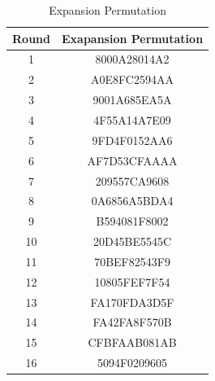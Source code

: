 \documentclass[12pt, letterpaper]{article}
\begin{document}
\begin{table}[h]
    \centering
    \begin{tabular}{|c|c|}
        
        \hline
        Round & Exapansion Permutation \\
        \hline
        1 & 8000A28014A2   \\
        \hline
        2 & A0E8FC2594AA
        \\
        \hline
        3  & 9001A685EA5A
        \\
         \hline
        4 & 4F55A14A7E09
        \\
         \hline
        5 & 9FD4F0152AA6
        \\
         \hline
        6 & AF7D53CFAAAA
        \\
         \hline
        7 & 209557CA9608
        \\
         \hline
        8 & 0A6856A5BDA4
        \\
         \hline
        9 & B594081F8002
        \\
         \hline
        10 & 20D45BE5545C
        \\
         \hline
        11 & 70BEF82543F9
        \\
         \hline
        12 & 10805FEF7F54
        \\
         \hline
        13 & FA170FDA3D5F
        \\
         \hline
        14 & FA42FA8F570B
        \\
         \hline
        15 & CFBFAAB081AB
        \\
         \hline
        16 & 5094F0209605
        \\
        \hline
        
    \end{tabular}
    \caption{Expansion Permutation}
    \label{tab:lpt-rpt}
\end{table}
\end{document}
